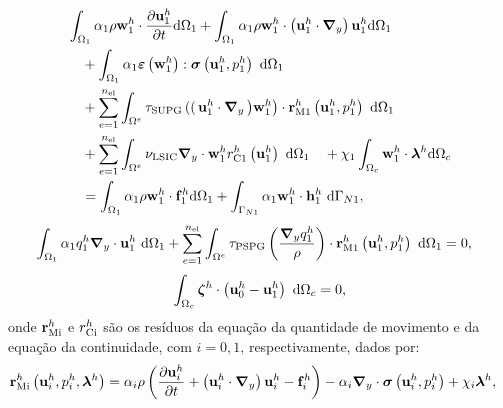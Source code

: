\begin{align}
	\begin{split}
		&\int_{\localModel} \arlequinWFLocal \density \wlocalh \cdot \frac{\partial\ulocalh}{\partial t} \deriv \localModel +
		\int_{\localModel} \arlequinWFLocal \density \wlocalh \cdot  \left(\ulocalh \cdot \gradient \right)\ulocalh \deriv \localModel  \\ 
		&\quad+	
		\int_{\localModel} \arlequinWFLocal \straintensor \left(\wlocalh\right) : \stressTensor \left(\ulocalh,\plocalh\right)\ \deriv \localModel 
		\\ 
		&\quad+ \sum_{e=1}^{\nel} \int_{\domainE} \SUPG  \left( \right(\ulocalh \cdot \gradient \left) \wlocalh\right) \cdot \resMomLocal\left(\ulocalh,\plocalh \right)\  \deriv \localModel \\ 
		&\quad+\sum_{e=1}^{\nel} \int_{\domainE} \LSIC \divergence \cdot \wlocalh \resPreLocal
		\left(\ulocalh\right)\  \deriv \localModel 
		\quad+ \chi_{1} \int_{\gluingZone} \wlocalh \cdot \lagrangeMultiplierh \deriv \gluingZone  \\
		&\quad= \int_{\localModel} \arlequinWFLocal \density \wlocalh \cdot  \localsbodyforceh \deriv \localModel + \int_{\localBoundaryN} \arlequinWFLocal \wlocalh \cdot \localSurfaceLoadh\ \deriv \localBoundaryN,
		\label{eq:QM_forma_fraca_1}
	\end{split}
\end{align}
\begin{align}
	\begin{split}
		&	\int_{\Omega_1} \alpha_1 q_1^h \boldsymbol{\nabla}_y \cdot \mathbf{u}_1^h \ \mathrm{d} \Omega_1 +
		\sum_{e=1}^{n_{\mathrm{el}}} \int_{\Omega^e} \tau_{\mathrm{PSPG}} \left(\frac{\boldsymbol{\nabla}_y q_1^h}{\rho}\right) \cdot \mathbf{r}_{\mathrm{M1}}^{h} \left(\mathbf{u}_1^h,p_1^h\right) \  \mathrm{d} \Omega_1 = 0,
		\label{eq:C_forma_fraca_1}
	\end{split}
\end{align}
\begin{align}
	\int_{\Omega_c}  \boldsymbol{\zeta}^h  \cdot \left(\mathbf{u}_0^h - \mathbf{u}_1^h \right) \ \mathrm{d} \Omega_c = 0, 
	\label{eq:lag_acopl}
\end{align}
\noindent onde $\mathbf{r}_{\mathrm{Mi}}^{h}$ e ${r_{\mathrm{Ci}}^{h}}$ são os resíduos da equação da quantidade de movimento e da equação da continuidade, com $i=0,1$, respectivamente, dados por:
\begin{align}
	\mathbf{r}_{\mathrm{Mi}}^{h} \left(\mathbf{u}_i^{h},p_i^{h},\boldsymbol{\lambda}^h \right)&=\alpha_i \rho\left(\frac{\partial\mathbf{u}_i^{h}}{\partial t}+ \left( \mathbf{u}_i^{h} \cdot \boldsymbol{\nabla}_y \right) \mathbf{u}_i^{h} - \mathbf{f}_i^{h}\right) - \alpha_i \boldsymbol{\nabla}_y \cdot \boldsymbol{\sigma}\left(\mathbf{u}_i^{h},p_i^{h}\right)+ \chi_{i} \boldsymbol{\lambda}^h \label{eq:res_QM_i},
\end{align}
